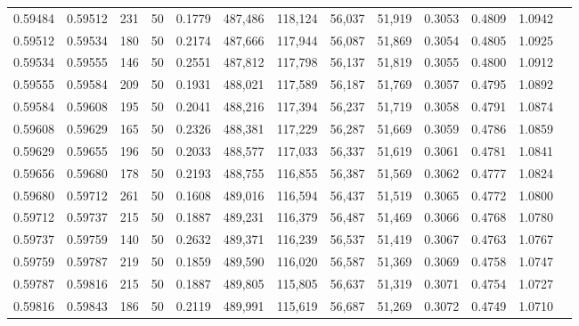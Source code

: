 \begin{tabular}{rrrrrrrrrrrrr}
0.59484 & 0.59512 &   231 &  50 &                                     0.1779 & 487,486 & 118,124 &  56,037 &  51,919 & 0.3053 & 0.4809 & 1.0942 \\
0.59512 & 0.59534 &   180 &  50 &                                     0.2174 & 487,666 & 117,944 &  56,087 &  51,869 & 0.3054 & 0.4805 & 1.0925 \\
0.59534 & 0.59555 &   146 &  50 &                                     0.2551 & 487,812 & 117,798 &  56,137 &  51,819 & 0.3055 & 0.4800 & 1.0912 \\
0.59555 & 0.59584 &   209 &  50 &                                     0.1931 & 488,021 & 117,589 &  56,187 &  51,769 & 0.3057 & 0.4795 & 1.0892 \\
0.59584 & 0.59608 &   195 &  50 &                                     0.2041 & 488,216 & 117,394 &  56,237 &  51,719 & 0.3058 & 0.4791 & 1.0874 \\
0.59608 & 0.59629 &   165 &  50 &                                     0.2326 & 488,381 & 117,229 &  56,287 &  51,669 & 0.3059 & 0.4786 & 1.0859 \\
0.59629 & 0.59655 &   196 &  50 &                                     0.2033 & 488,577 & 117,033 &  56,337 &  51,619 & 0.3061 & 0.4781 & 1.0841 \\
0.59656 & 0.59680 &   178 &  50 &                                     0.2193 & 488,755 & 116,855 &  56,387 &  51,569 & 0.3062 & 0.4777 & 1.0824 \\
0.59680 & 0.59712 &   261 &  50 &                                     0.1608 & 489,016 & 116,594 &  56,437 &  51,519 & 0.3065 & 0.4772 & 1.0800 \\
0.59712 & 0.59737 &   215 &  50 &                                     0.1887 & 489,231 & 116,379 &  56,487 &  51,469 & 0.3066 & 0.4768 & 1.0780 \\
0.59737 & 0.59759 &   140 &  50 &                                     0.2632 & 489,371 & 116,239 &  56,537 &  51,419 & 0.3067 & 0.4763 & 1.0767 \\
0.59759 & 0.59787 &   219 &  50 &                                     0.1859 & 489,590 & 116,020 &  56,587 &  51,369 & 0.3069 & 0.4758 & 1.0747 \\
0.59787 & 0.59816 &   215 &  50 &                                     0.1887 & 489,805 & 115,805 &  56,637 &  51,319 & 0.3071 & 0.4754 & 1.0727 \\
0.59816 & 0.59843 &   186 &  50 &                                     0.2119 & 489,991 & 115,619 &  56,687 &  51,269 & 0.3072 & 0.4749 & 1.0710 \\

\end{tabular}
